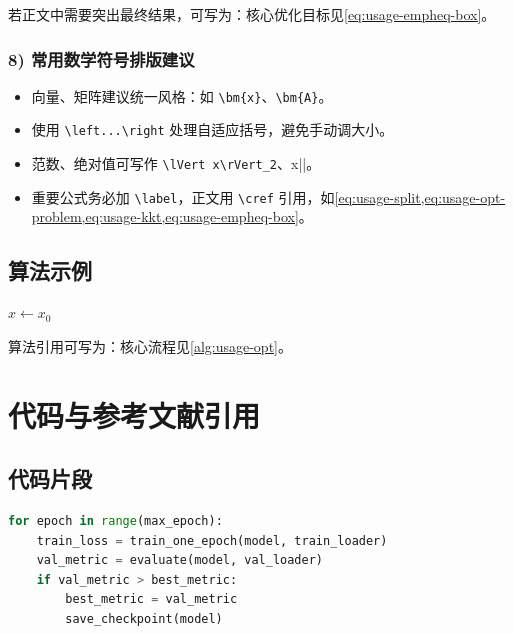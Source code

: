 若正文中需要突出最终结果，可写为：核心优化目标见\cref{eq:usage-empheq-box}。

\subsubsection*{8) 常用数学符号排版建议}
\begin{itemize}
  \item 向量、矩阵建议统一风格：如 \verb|\bm{x}|、\verb|\bm{A}|。
  \item 使用 \verb|\left...\right| 处理自适应括号，避免手动调大小。
  \item 范数、绝对值可写作 \verb|\lVert x\rVert_2|、\verb||x||。
  \item 重要公式务必加 \verb|\label|，正文用 \verb|\cref| 引用，如\cref{eq:usage-split,eq:usage-opt-problem,eq:usage-kkt,eq:usage-empheq-box}。
\end{itemize}

\subsection{算法示例}

\begin{algorithm}[H]
\caption{示例算法：梯度下降迭代求解}
\label{alg:usage-opt}
$x \leftarrow x_0$\\
\end{algorithm}

算法引用可写为：核心流程见\cref{alg:usage-opt}。

\section{代码与参考文献引用}

\subsection{代码片段}
\begin{lstlisting}[language=Python,caption={示例：训练循环伪代码},label={lst:usage-train}]
for epoch in range(max_epoch):
    train_loss = train_one_epoch(model, train_loader)
    val_metric = evaluate(model, val_loader)
    if val_metric > best_metric:
        best_metric = val_metric
        save_checkpoint(model)
\end{lstlisting}

